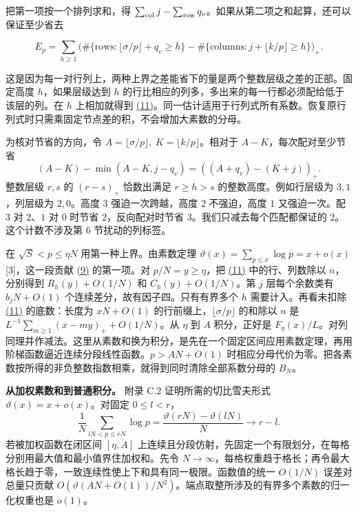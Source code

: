\documentclass[11pt,a4paper]{article}
\begin{document}
把第一项按一个排列求和，得 \(\sum_{\rm col}j-\sum_{\rm row}q_v\)。如果从第二项之和起算，还可以保证至少省去

\[
 E_p=\sum_{h\ge1}
 \big(\#\{\text{rows}:\lfloor\sigma/p\rfloor+q_v\ge h\}
       -\#\{\text{columns}: j+\lfloor k/p\rfloor\ge h\}\big)_+ .          \tag{11}\label{eq:11}
\]

这是因为每一对行列上，两种上界之差能省下的量是两个整数层级之差的正部。固定高度 \(h\)，如果层级达到 \(h\) 的行比相应的列多，多出来的每一行都必须配给低于该层的列。在 \(h\) 上相加就得到 \hyperref[eq:11]{(11)}。同一估计适用于行列式所有系数。恢复原行列式时只需乘固定节点差的积，不会增加大素数的分母。

为核对节省的方向，令 \(A=\lfloor\sigma/p\rfloor,\ K=\lfloor k/p\rfloor\)。相对于 \(A-K\)，每次配对至少节省 \[
 (A-K)-\min(A-K,j-q_v)=((A+q_v)-(K+j))_+ .
\] 整数层级 \(r,s\) 的 \((r-s)_+\) 恰数出满足 \(r\ge h>s\) 的整数高度。例如行层级为 \(3,1\)，列层级为 \(2,0\)。高度 \(3\) 强迫一次跨越，高度 \(2\) 不强迫，高度 \(1\) 又强迫一次。配 \(3\) 对 \(2\)、\(1\) 对 \(0\) 时节省 \(2\)，反向配对时节省 \(3\)。我们只减去每个匹配都保证的 \(2\)。这个计数不涉及第 6 节扰动的列标签。

在 \(\sqrt S<p\le\eta N\) 用第一种上界。由素数定理 \(\vartheta(x)=\sum_{p\le x}\log p=x+o(x)\) {[}3{]}，这一段贡献 \hyperref[eq:9]{(9)} 的第一项。对 \(p/N=y\ge\eta\)，把 \hyperref[eq:11]{(11)} 中的行、列数除以 \(n\)，分别得到 \(R_h(y)+O(1/N)\) 和 \(C_h(y)+O(1/N)\)。第 \(j\) 层每个余数类有 \(b_jN+O(1)\) 个连续差分，故有因子四。只有有界多个 \(h\) 需要计入。再看未扣除 \hyperref[eq:11]{(11)} 的底数：长度为 \(xN+O(1)\) 的行前缀上，\(\lfloor\sigma/p\rfloor\) 的和除以 \(n\) 是 \(L^{-1}\sum_{m\ge1}(x-my)_++O(1/N)\)。从 \(\eta\) 到 \(A\) 积分，正好是 \(F_\eta(x)/L\)。对列同理并作减法。这里从素数和换为积分，是先在一个固定区间应用素数定理，再用阶梯函数逼近连续分段线性函数。\(p>AN+O(1)\) 时相应分母代价为零。把各素数按所得的非负整数指数相乘，就得到同时清除全部系数分母的 \(B_N\)。

\textbf{从加权素数和到普通积分。} 附录 C.2 证明所需的切比雪夫形式 \(\vartheta(x)=x+o(x)\)。对固定 \(0\le l<r\)， \[
 \frac1N\sum_{lN<p\le rN}\log p
 =\frac{\vartheta(rN)-\vartheta(lN)}N\longrightarrow r-l .
\] 若被加权函数在闭区间 \([\eta,A]\) 上连续且分段仿射，先固定一个有限划分，在每格分别用最大值和最小值界住加权和。先令 \(N\to\infty\)，每格权重趋于格长；再令最大格长趋于零，一致连续性使上下和具有同一极限。函数值的统一 \(O(1/N)\) 误差对总量只贡献 \(O(\vartheta(AN+O(1))/N^2)\)。端点取整所涉及的有界多个素数的归一化权重也是 \(o(1)\)。
\end{document}

